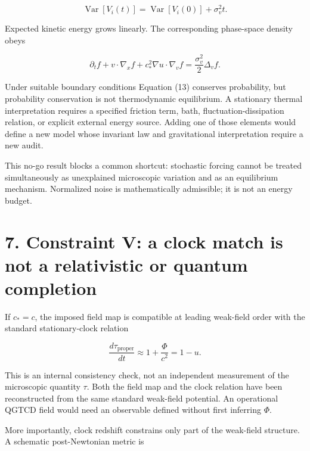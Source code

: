 \documentclass[
  american,
  11pt,
  letterpaper,
]{article}
\begin{document}
\begin{equation}
\operatorname{Var}[V_i(t)]
=\operatorname{Var}[V_i(0)]+\sigma_v^2t.
\tag{12}
\end{equation}

Expected kinetic energy grows linearly. The corresponding phase-space density obeys

\begin{equation}
\partial_t f+v\cdot\nabla_x f+c_*^2\nabla u\cdot\nabla_v f
=\frac{\sigma_v^2}{2}\Delta_v f.
\tag{13}
\end{equation}

Under suitable boundary conditions Equation (13) conserves probability, but probability conservation is not thermodynamic equilibrium. A stationary thermal interpretation requires a specified friction term, bath, fluctuation-dissipation relation, or explicit external energy source. Adding one of those elements would define a new model whose invariant law and gravitational interpretation require a new audit.

This no-go result blocks a common shortcut: stochastic forcing cannot be treated simultaneously as unexplained microscopic variation and as an equilibrium mechanism. Normalized noise is mathematically admissible; it is not an energy budget.

\section{7. Constraint V: a clock match is not a relativistic or quantum completion}\label{constraint-v-a-clock-match-is-not-a-relativistic-or-quantum-completion}

If \(c_*=c\), the imposed field map is compatible at leading weak-field order with the standard stationary-clock relation

\begin{equation}
\frac{d\tau_{\mathrm{proper}}}{dt}\approx 1+\frac{\Phi}{c^2}=1-u.
\tag{14}
\end{equation}

This is an internal consistency check, not an independent measurement of the microscopic quantity \(\tau\). Both the field map and the clock relation have been reconstructed from the same standard weak-field potential. An operational QGTCD field would need an observable defined without first inferring \(\Phi\).

More importantly, clock redshift constrains only part of the weak-field structure. A schematic post-Newtonian metric is
\end{document}
